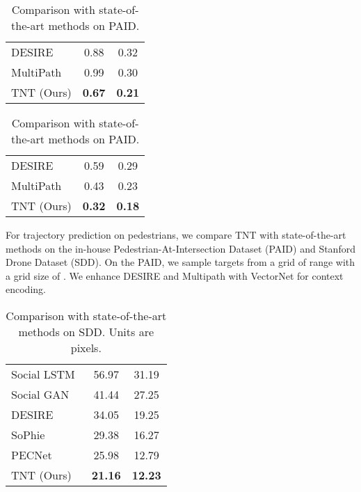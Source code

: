 \documentclass{article}
\newcommand{\model}{TNT\xspace}
\begin{document}
\begin{table}[h]
    \begin{minipage}{.45\linewidth}
        \centering
        \caption{Model performance on INTERACTION validation set.}
        \label{tbl-interaction}
        \begin{tabular}{l|cc}
        \toprule
        &  &  \\  \midrule
        DESIRE~\cite{DESIRE} & 0.88 & 0.32\\
        MultiPath~\cite{chai2019multipath} & 0.99 & 0.30\\
        TNT (Ours) & \textbf{0.67} & \textbf{0.21} \\\bottomrule
    \end{tabular}
    \end{minipage}
    \hspace{0.5in}
    \begin{minipage}{.45\linewidth}
        \centering
        \caption{Comparison with state-of-the-art methods on PAID.}
          \label{tbl-inhouse-stoa}
          \centering
        \begin{tabular}{l|c|c}
        \toprule
                &  &  \\  \midrule
        DESIRE~\cite{DESIRE} & 0.59 & 0.29 \\
        MultiPath~\cite{chai2019multipath} & 0.43 & 0.23\\
        TNT (Ours) & \textbf{0.32} & \textbf{0.18} \\\bottomrule
        \end{tabular}
    \end{minipage} 
\end{table}


For trajectory prediction on pedestrians, we compare \model with state-of-the-art methods on the in-house Pedestrian-At-Intersection Dataset (PAID) and Stanford Drone Dataset (SDD).
On the PAID, we sample targets from a grid of range  with a grid size of . We enhance DESIRE and Multipath with VectorNet for context encoding.

\begin{table}
    \centering
    \caption{Comparison with state-of-the-art methods on SDD. Units are pixels.}
      \label{tbl-sdd-stoa}
      \centering
    \begin{tabular}{l|cc}
    \toprule
        &  &  \\  \midrule
    Social LSTM~\cite{SocialLSTM} & 56.97 & 31.19 \\
    Social GAN~\cite{SocialGAN} & 41.44 & 27.25 \\
    DESIRE~\cite{DESIRE} & 34.05 & 19.25 \\
    SoPhie~\cite{sadeghian2019sophie} & 29.38 & 16.27 \\
    PECNet~\cite{mangalam2020not} & 25.98 & 12.79 \\
    TNT (Ours) & \textbf{21.16} & \textbf{12.23} \\\bottomrule
    \end{tabular}
\end{table}
\end{document}
